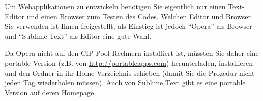 %
\par Um Webapplikationen zu entwickeln benötigen Sie eigentlich nur einen
Text-Editor und einen Browser zum Testen des Codes. Welchen Editor und Browser
Sie verwenden ist Ihnen freigestellt, als Einstieg ist jedoch ``Opera'' als
Browser und ``Sublime Text'' als Editor eine gute Wahl. 
%
\par Da Opera nicht auf den CIP-Pool-Rechnern installiert ist, müssten Sie daher
eine portable Version (z.B. von \url{http://portableapps.com}) herunterladen,
installieren und den Ordner in ihr Home-Verzeichnis schieben (damit Sie die
Prozedur nicht jeden Tag wiederholen müssen). Auch von Sublime Text gibt es
eine portable Version auf deren Homepage.